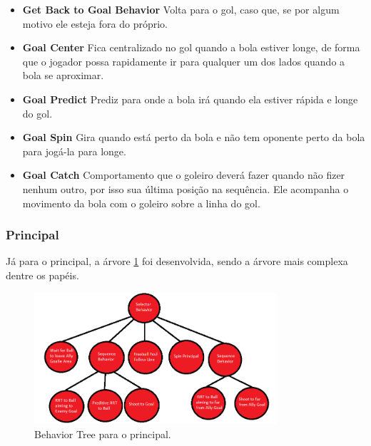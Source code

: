 \documentclass[a4paper,12pt]{article}
\begin{document}
\begin{itemize}

\item \textbf{Get Back to Goal Behavior} Volta para o gol, caso que, se por algum motivo ele esteja fora do próprio.

\item \textbf{Goal Center} Fica centralizado no gol quando a bola estiver longe, de forma que o jogador possa rapidamente ir para qualquer um dos lados quando a bola se aproximar.

\item \textbf{Goal Predict} Prediz para onde a bola irá quando ela estiver rápida e longe do gol.

\item \textbf{Goal Spin} Gira quando está perto da bola e não tem oponente perto da bola para jogá-la para longe.

\item \textbf{Goal Catch} Comportamento que o goleiro deverá fazer quando não fizer nenhum outro, por isso sua última posição na sequência. Ele acompanha o movimento da bola com o goleiro sobre a linha do gol.

\end{itemize}



\subsubsection{Principal}

Já para o principal, a árvore \ref{fig:principal_bt} foi desenvolvida, sendo a árvore mais complexa dentre os papéis.

\begin{figure}[H]
	\centering
	\includegraphics[width=0.8\textwidth]{figures/Principal_BT.png}
   	\caption{Behavior Tree para o principal.} \label{fig:principal_bt}
\end{figure}   
\end{document}
